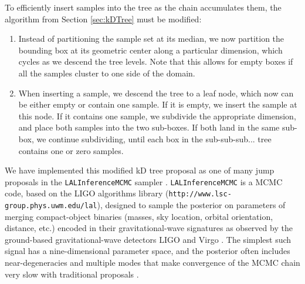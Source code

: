 \documentclass{iopart}
\newcommand{\Nbox}{N_\mathrm{box}}
\newcommand{\ilya}[1]{{\color{red} \bf #1}}
\newcommand{\dan}[1]{{\color{magenta} \bf #1}}
\newcommand{\order}[1]{\mathcal{O}\left( #1 \right)}
\begin{document}
To efficiently insert samples into the tree as the chain accumulates them,
the algorithm from Section \ref{sec:kDTree} must be modified:
\begin{enumerate}
\item Instead of partitioning the sample set at its median, we now
  partition the bounding box at its geometric center along a
  particular dimension, which cycles as we descend the tree levels.
  Note that this allows for empty boxes if all the samples cluster to
  one side of the domain.
\item When inserting a sample, we descend the tree to a leaf node,
  which now can be either empty or contain one sample.  If it is empty,
  we insert the sample at this node.  If it contains one sample, we
  subdivide the appropriate dimension, and place both samples into the
  two sub-boxes.  If both land in the same sub-box, we continue
  subdividing, until each box in the sub-sub-sub... tree contains one
  or zero samples.
\end{enumerate}

We have implemented this modified kD tree proposal as one of many jump
proposals in the \texttt{LALInferenceMCMC} sampler
\cite{vanderSluys:2008a,Raymond:2010,Raymond2012,Veitch:2014}.
\texttt{LALInferenceMCMC} is a MCMC code, based on the LIGO algorithms
library ({\tt http://www.lsc-group.phys.uwm.edu/lal}), designed to sample the posterior on parameters of merging
compact-object binaries (masses, sky location, orbital orientation, distance, etc.) 
encoded in their gravitational-wave signatures as observed by the ground-based
gravitational-wave detectors LIGO \cite{AdvLIGO} and Virgo \cite{AdvVirgo}.  The simplest such
signal has a nine-dimensional parameter space, and the posterior often
includes near-degeneracies and multiple modes that make convergence of
the MCMC chain very slow with traditional proposals \cite{S6PE}.  
\end{document}
